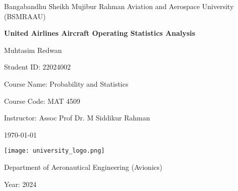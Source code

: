 \begin{titlepage}
    \centering
    \vspace*{1.5cm}

    {\LARGE Bangabandhu Sheikh Mujibur Rahman Aviation and Aerospace University (BSMRAAU)\par}
    \vspace{1.5cm}

    \vspace*{\fill} %
    {\huge\bfseries United Airlines Aircraft Operating Statistics Analysis\par}
    \vspace{0.5cm}

    {\large Muhtasim Redwan\par}
    {\large Student ID: 22024002\par}
    \vspace{0.5cm}

    {\large Course Name: Probability and Statistics\par}
    {\large Course Code: MAT 4509}
    \vspace{0.5cm}

    {\large Instructor: Assoc Prof Dr. M Siddikur Rahman\par}
    \vspace{0.5cm}

    \vspace*{\fill} %

    {\large \today\par}

    \vfill

    \texttt{[image: university\_logo.png]}

    {\large Department of Aeronautical Engineering (Avionics)\par}
    {\large Year: 2024\par}
\end{titlepage}